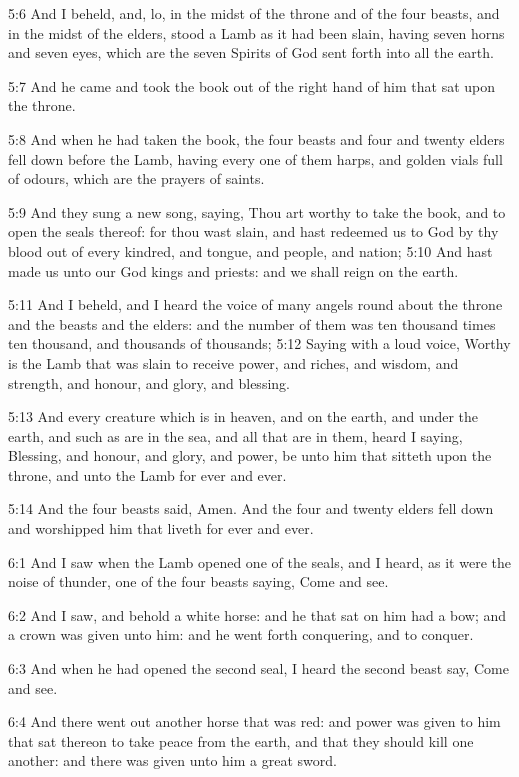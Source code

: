5:6 And I beheld, and, lo, in the midst of the throne and of the four
beasts, and in the midst of the elders, stood a Lamb as it had been
slain, having seven horns and seven eyes, which are the seven Spirits
of God sent forth into all the earth.

5:7 And he came and took the book out of the right hand of him that
sat upon the throne.

5:8 And when he had taken the book, the four beasts and four and
twenty elders fell down before the Lamb, having every one of them
harps, and golden vials full of odours, which are the prayers of
saints.

5:9 And they sung a new song, saying, Thou art worthy to take the
book, and to open the seals thereof: for thou wast slain, and hast
redeemed us to God by thy blood out of every kindred, and tongue, and
people, and nation; 5:10 And hast made us unto our God kings and
priests: and we shall reign on the earth.

5:11 And I beheld, and I heard the voice of many angels round about
the throne and the beasts and the elders: and the number of them was
ten thousand times ten thousand, and thousands of thousands; 5:12
Saying with a loud voice, Worthy is the Lamb that was slain to receive
power, and riches, and wisdom, and strength, and honour, and glory,
and blessing.

5:13 And every creature which is in heaven, and on the earth, and
under the earth, and such as are in the sea, and all that are in them,
heard I saying, Blessing, and honour, and glory, and power, be unto
him that sitteth upon the throne, and unto the Lamb for ever and ever.

5:14 And the four beasts said, Amen. And the four and twenty elders
fell down and worshipped him that liveth for ever and ever.

6:1 And I saw when the Lamb opened one of the seals, and I heard, as
it were the noise of thunder, one of the four beasts saying, Come and
see.

6:2 And I saw, and behold a white horse: and he that sat on him had a
bow; and a crown was given unto him: and he went forth conquering, and
to conquer.

6:3 And when he had opened the second seal, I heard the second beast
say, Come and see.

6:4 And there went out another horse that was red: and power was given
to him that sat thereon to take peace from the earth, and that they
should kill one another: and there was given unto him a great sword.

